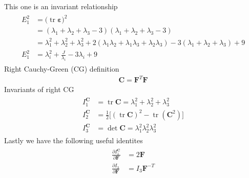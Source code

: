 \documentclass[12pt,3p]{article}
\numberwithin{equation}{section}
\begin{document}
This one is an invariant relationship 
\begin{align}
\begin{split}
E_1^2 &= \big( \operatorname{tr} \boldsymbol{\varepsilon} \big)^2 \\
	   &= ( \lambda_1 + \lambda_2 + \lambda_3 -3 ) ( \lambda_1 + \lambda_2 + \lambda_3 -3 ) \\
	   &= \lambda_1^2 + \lambda_2^2 + \lambda_3^2 
	   + 2 (\lambda_1 \lambda_2 + \lambda_1 \lambda_3 + \lambda_2 \lambda_3 ) 
	   - 3 (\lambda_1 + \lambda_2 + \lambda_3 ) + 9 \\
E_1^2 &= \lambda_i^2 + \frac{J}{\lambda_i} - 3 \lambda_i + 9
\end{split}
\end{align}
Right Cauchy-Green (CG) definition
\begin{align}
\mathbf{C} = \mathbf{F}^T \mathbf{F}
\end{align}
Invariants of right CG
\begin{align}
\begin{split}
I^\mathbf{C}_{1} &= \operatorname{tr} \mathbf{C} = \lambda_1^2 + \lambda_2^2 + \lambda_3^2\\
I^\mathbf{C}_{2} &= \frac{1}{2} \big[ ( \operatorname{tr} \mathbf{C} )^2 - \operatorname{tr} (\mathbf{C}^2) \big] \\
I^\mathbf{C}_{3} &= \operatorname{det} \mathbf{C} = \lambda_1^2 \lambda_2^2 \lambda_3^2
\end{split}
\end{align}
Lastly we have the following useful identites
\begin{align}\label{EqProof1}
\begin{split}
\frac{\partial I_1^{\mathbf{C}}}{\partial \mathbf{F}} &= 2 \mathbf{F} \\
\frac{\partial I_3}{\partial \mathbf{F}} &= I_3 \mathbf{F}^{-T}
\end{split}
\end{align}

\end{document}
